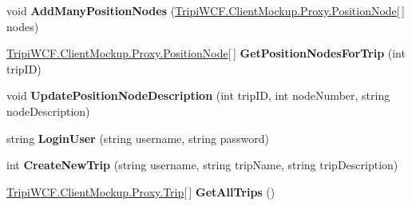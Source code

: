 \begin{DoxyCompactItemize}
\item 
\hypertarget{interface_tripi_w_c_f_1_1_client_mockup_1_1_proxy_1_1_i_trip_service_ae49d01ed708a902da84ea3f2709dd171}{
void {\bfseries AddManyPositionNodes} (\hyperlink{class_tripi_w_c_f_1_1_client_mockup_1_1_proxy_1_1_position_node}{TripiWCF.ClientMockup.Proxy.PositionNode}\mbox{[}$\,$\mbox{]} nodes)}
\label{interface_tripi_w_c_f_1_1_client_mockup_1_1_proxy_1_1_i_trip_service_ae49d01ed708a902da84ea3f2709dd171}

\item 
\hypertarget{interface_tripi_w_c_f_1_1_client_mockup_1_1_proxy_1_1_i_trip_service_a94f0b89ebce82a430cac8e5867fe8406}{
\hyperlink{class_tripi_w_c_f_1_1_client_mockup_1_1_proxy_1_1_position_node}{TripiWCF.ClientMockup.Proxy.PositionNode}\mbox{[}$\,$\mbox{]} {\bfseries GetPositionNodesForTrip} (int tripID)}
\label{interface_tripi_w_c_f_1_1_client_mockup_1_1_proxy_1_1_i_trip_service_a94f0b89ebce82a430cac8e5867fe8406}

\item 
\hypertarget{interface_tripi_w_c_f_1_1_client_mockup_1_1_proxy_1_1_i_trip_service_ad7182a47d94448db54ba552032d9c0d7}{
void {\bfseries UpdatePositionNodeDescription} (int tripID, int nodeNumber, string nodeDescription)}
\label{interface_tripi_w_c_f_1_1_client_mockup_1_1_proxy_1_1_i_trip_service_ad7182a47d94448db54ba552032d9c0d7}

\item 
\hypertarget{interface_tripi_w_c_f_1_1_client_mockup_1_1_proxy_1_1_i_trip_service_a446a7cca0e65b64914da8a5abb56ea9b}{
string {\bfseries LoginUser} (string username, string password)}
\label{interface_tripi_w_c_f_1_1_client_mockup_1_1_proxy_1_1_i_trip_service_a446a7cca0e65b64914da8a5abb56ea9b}

\item 
\hypertarget{interface_tripi_w_c_f_1_1_client_mockup_1_1_proxy_1_1_i_trip_service_a992b00d8b51e0509d90ae9dfac7f47d4}{
int {\bfseries CreateNewTrip} (string username, string tripName, string tripDescription)}
\label{interface_tripi_w_c_f_1_1_client_mockup_1_1_proxy_1_1_i_trip_service_a992b00d8b51e0509d90ae9dfac7f47d4}

\item 
\hypertarget{interface_tripi_w_c_f_1_1_client_mockup_1_1_proxy_1_1_i_trip_service_abc1b1dc6819d30392eaf1652393fba56}{
\hyperlink{class_tripi_w_c_f_1_1_client_mockup_1_1_proxy_1_1_trip}{TripiWCF.ClientMockup.Proxy.Trip}\mbox{[}$\,$\mbox{]} {\bfseries GetAllTrips} ()}
\label{interface_tripi_w_c_f_1_1_client_mockup_1_1_proxy_1_1_i_trip_service_abc1b1dc6819d30392eaf1652393fba56}


\end{DoxyCompactItemize}
